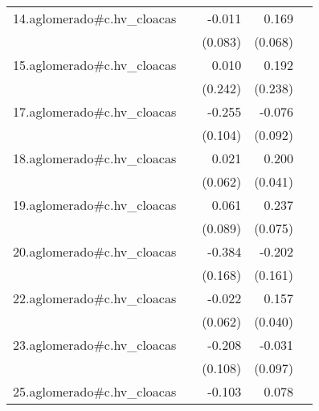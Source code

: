 {\begin{longtable}{l*{4}{D{.}{.}{-1}}}
\addlinespace
14.aglomerado#c.hv\_cloacas&                     &      -0.011         &       0.169\sym{*}  &                     \\
            &                     &     (0.083)         &     (0.068)         &                     \\
\addlinespace
15.aglomerado#c.hv\_cloacas&                     &       0.010         &       0.192         &                     \\
            &                     &     (0.242)         &     (0.238)         &                     \\
\addlinespace
17.aglomerado#c.hv\_cloacas&                     &      -0.255\sym{*}  &      -0.076         &                     \\
            &                     &     (0.104)         &     (0.092)         &                     \\
\addlinespace
18.aglomerado#c.hv\_cloacas&                     &       0.021         &       0.200\sym{***}&                     \\
            &                     &     (0.062)         &     (0.041)         &                     \\
\addlinespace
19.aglomerado#c.hv\_cloacas&                     &       0.061         &       0.237\sym{**} &                     \\
            &                     &     (0.089)         &     (0.075)         &                     \\
\addlinespace
20.aglomerado#c.hv\_cloacas&                     &      -0.384\sym{*}  &      -0.202         &                     \\
            &                     &     (0.168)         &     (0.161)         &                     \\
\addlinespace
22.aglomerado#c.hv\_cloacas&                     &      -0.022         &       0.157\sym{***}&                     \\
            &                     &     (0.062)         &     (0.040)         &                     \\
\addlinespace
23.aglomerado#c.hv\_cloacas&                     &      -0.208         &      -0.031         &                     \\
            &                     &     (0.108)         &     (0.097)         &                     \\
\addlinespace
25.aglomerado#c.hv\_cloacas&                     &      -0.103         &       0.078         &                     \\

\end{longtable}}
